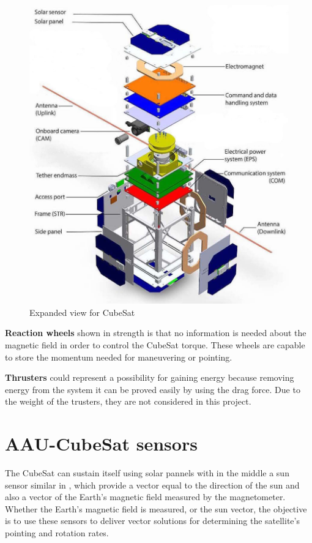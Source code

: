 \begin{table}[H]
\begin{minipage}[b]{0.49\linewidth}
\begin{figure}[H]
			\includegraphics[width=1\linewidth]{figures/cubsat1}
			\caption{Expanded view for CubeSat}
			\label{fig:csat}
		\end{figure}
	\end{minipage}
\end{table}
%
\textbf{Reaction wheels} shown in  strength is that no information is needed about the magnetic field in order to control the CubeSat torque. These wheels are capable to store the momentum needed for maneuvering or pointing.

\textbf{Thrusters} could represent a possibility for gaining energy because removing energy from the system it can be proved easily by using the drag force. Due to the weight of the trusters, they are not considered in this project.
\section{AAU-CubeSat sensors}
The CubeSat can sustain itself using solar pannels with in the middle a sun sensor similar in  , which provide a vector equal to the direction of the sun and also a vector of the Earth's magnetic field measured by the magnetometer. Whether the Earth’s magnetic field is measured, or the sun vector, the objective is to use these sensors to deliver vector solutions for determining the satellite’s pointing and rotation rates.

